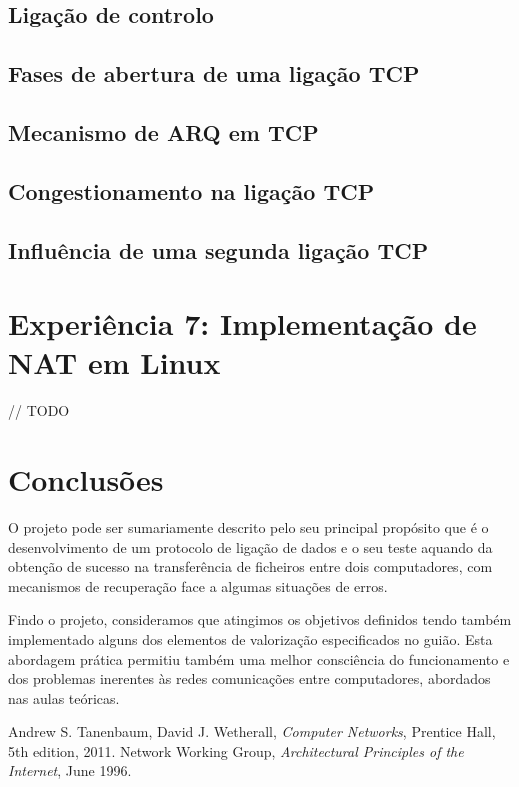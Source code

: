 \documentclass[a4paper,11pt,titlepage]{article}
\begin{document}
\subsection*{Ligação de controlo}

\subsection*{Fases de abertura de uma ligação TCP}

\subsection*{Mecanismo de ARQ em TCP}

\subsection*{Congestionamento na ligação TCP}

\subsection*{Influência de uma segunda ligação TCP}

\section{Experiência 7: Implementação de NAT em Linux }

// TODO

\section{Conclusões}

O projeto pode ser sumariamente descrito pelo seu principal propósito que é o
desenvolvimento de um protocolo de ligação de dados e o seu teste aquando da
obtenção de sucesso na transferência de ficheiros entre dois computadores, com
mecanismos de recuperação face a algumas situações de erros. 


Findo o projeto, consideramos que atingimos os objetivos definidos tendo também
implementado alguns dos elementos de valorização especificados no guião. Esta
abordagem prática permitiu também uma melhor consciência do funcionamento e dos
problemas inerentes às redes comunicações entre computadores, abordados nas
aulas teóricas.

\begin{thebibliography}{9}
  Andrew S. Tanenbaum,
  David J. Wetherall,
  \emph{Computer Networks},
  Prentice Hall, 
  5th edition,
  2011.
  Network Working Group,
  \emph{Architectural Principles of the Internet},
  June 1996.
\end{thebibliography}
\end{document}
